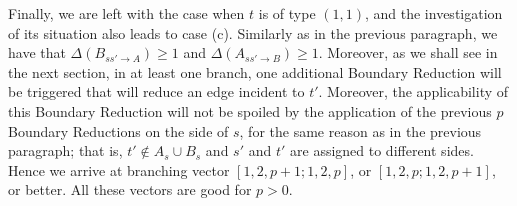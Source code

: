 Finally, we are left with the case when $t$ is of type $(1,1)$, and the investigation of its situation also leads to case (c). Similarly as in the previous paragraph, we have that $\Delta(B_{ss'\to A})\geq 1$ and $\Delta(A_{ss'\to B})\geq 1$. Moreover, as we shall see in the next section, in at least one branch, one additional Boundary Reduction will be triggered that will reduce an edge incident to $t'$. Moreover, the applicability of this Boundary Reduction will not be spoiled by the application of the previous $p$ Boundary Reductions on the side of $s$, for the same reason as in the previous paragraph; that is, $t'\notin A_s\cup B_s$ and $s'$ and $t'$ are assigned to different sides. Hence we arrive at branching vector $[1,2,p+1;1,2,p]$, or $[1,2,p;1,2,p+1]$, or better. All these vectors are good for $p>0$.












